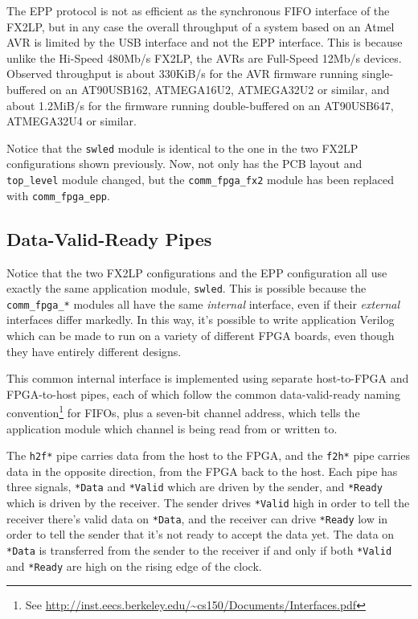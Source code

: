 The EPP protocol is not as efficient as the synchronous FIFO interface of the FX2LP, but in any case the overall throughput of a system based on an Atmel AVR is limited by the USB interface and not the EPP interface. This is because unlike the Hi-Speed 480Mb/s FX2LP, the AVRs are Full-Speed 12Mb/s devices. Observed throughput is about 330KiB/s for the AVR firmware running single-buffered on an AT90USB162, ATMEGA16U2, ATMEGA32U2 or similar, and about 1.2MiB/s for the firmware running double-buffered on an AT90USB647, ATMEGA32U4 or similar.

Notice that the \texttt{swled} module is identical to the one in the two FX2LP configurations shown previously. Now, not only has the PCB layout and \texttt{top\_level} module changed, but the \texttt{comm\_fpga\_fx2} module has been replaced with \texttt{comm\_fpga\_epp}.

\subsection{Data-Valid-Ready Pipes}
Notice that the two FX2LP configurations and the EPP configuration all use exactly the same application module, \texttt{swled}. This is possible because the \texttt{comm\_fpga\_*} modules all have the same \textit{internal} interface, even if their \textit{external} interfaces differ markedly. In this way, it's possible to write application Verilog which can be made to run on a variety of different FPGA boards, even though they have entirely different designs.


This common internal interface is implemented using separate host-to-FPGA and FPGA-to-host pipes, each of which follow the common data-valid-ready naming convention\footnote{See                                   
\url{http://inst.eecs.berkeley.edu/~cs150/Documents/Interfaces.pdf}} for FIFOs, plus a seven-bit channel address, which tells the application module which channel is being read from or written to.

The \texttt{h2f*} pipe carries data from the host to the FPGA, and the \texttt{f2h*} pipe carries data in the opposite direction, from the FPGA back to the host. Each pipe has three signals, \texttt{*Data} and \texttt{*Valid} which are driven by the sender, and \texttt{*Ready} which is driven by the receiver. The sender drives \texttt{*Valid} high in order to tell the receiver there's valid data on \texttt{*Data}, and the receiver can drive \texttt{*Ready} low in order to tell the sender that it's not ready to accept the data yet. The data on \texttt{*Data} is transferred from the sender to the receiver if and only if both \texttt{*Valid} and \texttt{*Ready} are high on the rising edge of the clock.

